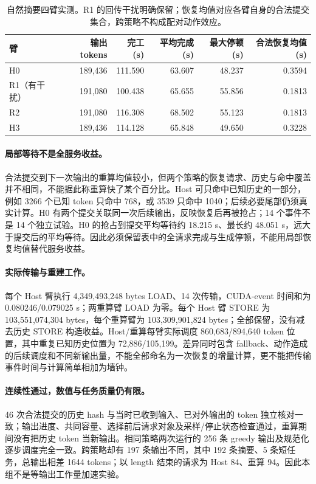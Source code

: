 \documentclass[UTF8,fontset=fandol,a4paper,10pt]{ctexart}
\begin{document}
\begin{table}[ht]
\centering\small
\caption{自然摘要四臂实测。R1 的回传干扰明确保留；恢复均值对应各臂自身的合法提交集合，跨策略不构成配对动作效应。}
\label{tab:summaryresults}
\begin{tabular}{@{}lrrrrr@{}}
\toprule
臂 & 输出 tokens & 完工(s) & 平均完成(s) & 最大停顿(s) & 合法恢复均值(s) \\
\midrule
H0 & 189,436 & 111.590 & 63.607 & 48.237 & 0.3594 \\
R1（有干扰） & 191,080 & 100.438 & 65.655 & 55.856 & 0.1813 \\
R2 & 191,080 & 116.308 & 68.502 & 55.123 & 0.1813 \\
H3 & 189,436 & 114.128 & 65.848 & 49.650 & 0.3228 \\
\bottomrule
\end{tabular}
\end{table}

\paragraph{局部等待不是全服务收益。}
合法提交到下一次输出的重算均值较小，但两个策略的恢复请求、历史与命中覆盖并不相同，不能据此称重算快了某个百分比。Host 可只命中已知历史的一部分，例如 3266 个已知 token 只命中 768，或 3539 只命中 1040；后续必要尾部仍须真实计算。H0 有两个提交关联同一次后续输出，反映恢复后再被抢占；14 个事件不是 14 个独立试验。H0 的抢占到提交平均等待约 18.215 s、最长约 48.051 s，远大于提交后的平均等待。因此必须保留表中的全请求完成与生成停顿，不能用局部恢复均值替代服务收益。

\paragraph{实际传输与重建工作。}
每个 Host 臂执行 4,349,493,248 bytes LOAD、14 次传输，CUDA-event 时间和为 0.080246/0.079025 s；两重算臂 LOAD 为零。每个 Host 臂 STORE 为 103,551,074,304 bytes，每个重算臂为 103,309,901,824 bytes；全部保留，没有减去历史 STORE 构造收益。Host/重算每臂实际调度 860,683/894,640 token 位置，其中重复已知历史位置为 72,886/105,199。差异同时包含 fallback、动作造成的后续调度和不同新输出量，不能全部命名为一次恢复的增量计算，更不能把传输事件时间与计算简单相加为墙钟。

\paragraph{连续性通过，数值与任务质量仍有限。}
46 次合法提交的历史 hash 与当时已收到输入、已对外输出的 token 独立核对一致；输出进度、共同容量、选择前后请求对象及采样/停止状态检查通过，重算期间没有把历史 token 当新输出。相同策略两次运行的 256 条 greedy 输出及规范化逐步调度完全一致。跨策略却有 197 条输出不同，其中 192 条摘要、5 条短任务，总输出相差 1644 tokens；以 length 结束的请求为 Host 84、重算 94。因此本组不是等输出工作量加速实验。
\end{document}
